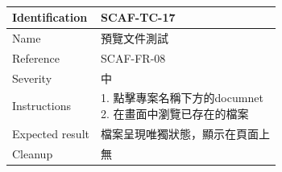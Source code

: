 \documentclass{report}
\begin{document}
\newline
\\
\begin{tabularx}{\textwidth}{
  |p{}%
  |p{}|%
  }
  \hline
  \centering Identification &  SCAF-TC-17 \\
  \hline
  \centering Name & 預覽文件測試 \\
  \hline
  \centering Reference & SCAF-FR-08 \\
  \hline
  \centering Severity & 中 \\
  \hline
 \centering Instructions & 
  \makecell[l]{
    1. 點擊專案名稱下方的documnet \\
    2. 在畫面中瀏覽已存在的檔案
  }\\
  \hline
  \centering Expected result & 檔案呈現唯獨狀態，顯示在頁面上 \\
  \hline
  \centering Cleanup & 無 \\
  \hline
\end{tabularx}
\\
\newline
\\
\end{document}
